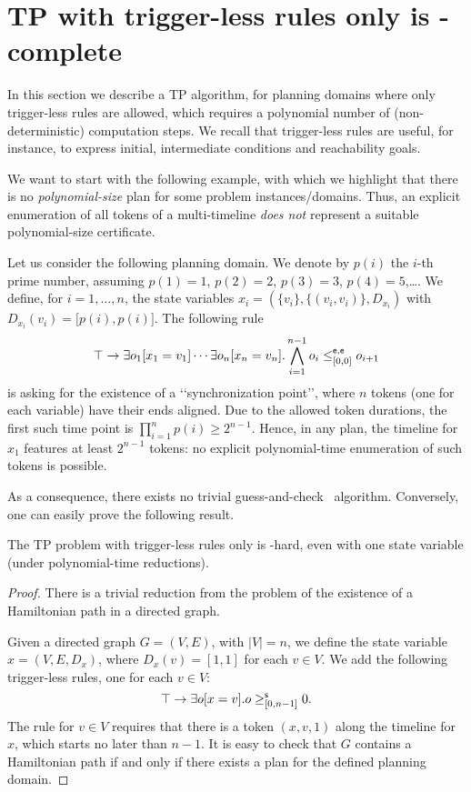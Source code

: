 \section{TP with trigger-less rules only is \NP-complete}\label{sec:NPtriggerless}

In this section we describe a TP algorithm,
for planning domains where only trigger-less rules are allowed,
which requires a polynomial number of (non-deterministic) computation steps.
We recall that trigger-less rules are useful, for instance, to express initial, intermediate conditions and reachability goals.

We want to start with the following example, with which we highlight that there is no \emph{polynomial-size} plan for some problem instances/domains. Thus, an explicit enumeration of all tokens of a multi-timeline \emph{does not} represent a suitable polynomial-size certificate.

\begin{example}
Let us consider the following planning domain.
We denote by $p(i)$ the $i$-th prime number, assuming $p(1)=1$, $p(2)=2$, $p(3)=3$, $p(4)=5$,\dots .
We define, for $i=1,\ldots,n$, the state variables $x_i=(\{v_i\},\{(v_i,v_i)\},D_{x_i})$ with $D_{x_i}(v_i)=\mathopen[p(i),p(i)\mathclose]$.
The following rule
\[
\operatorname{\top}\to \exists o_1[x_1=v_1] \cdots \exists o_n[x_n=v_n].\bigwedge_{i=1}^{n-1} o_i\leq_{[0,0]}^{\mathsf{e},\mathsf{e}} o_{i+1}
\]
is asking for the existence of a \lq\lq synchronization point\rq\rq , where $n$ tokens (one for each variable) have their ends aligned.
Due to the allowed token durations, the first such time point is $\prod_{i=1}^{n} p(i)\geq 2^{n-1}$.
Hence, in any plan, the timeline for $x_1$ features at least $2^{n-1}$ tokens: no explicit polynomial-time enumeration of such tokens is possible.
\end{example}
%
As a consequence, there exists no trivial guess-and-check \NP\ algorithm.
Conversely, one can easily prove the following result.
\begin{theorem}
The TP problem with trigger-less rules only is \NP-hard, even with one state variable (under polynomial-time reductions).
\end{theorem}
\begin{proof}
There is a trivial reduction from the problem of the existence of a Hamiltonian path in a directed graph.

Given a directed graph $G=(V,E)$, with $|V|=n$, 
we define the state variable $x=(V,E,D_x)$, where $D_x(v)=[1,1]$ for each $v\in V$.
We add the following trigger-less rules, one for each $v\in V$:
\[
\operatorname{\top} \to \exists o[x=v]. o\geq ^{\mathsf s}_{[0,n-1]} 0 .
\]
The rule for $v\in V$ requires that there is a token $(x,v,1)$ along the timeline for $x$, which starts no later than $n-1$.
It is easy to check that $G$ contains a Hamiltonian path if and only if there exists a plan for the defined planning domain.
\end{proof}

